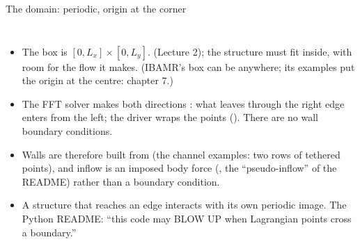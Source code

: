 \documentclass[aspectratio=169,11pt]{beamer}
\begin{document}
\begin{frame}{The domain: periodic, origin at the corner}
\label{fr:domain}
\begin{columns}[T]
\footnotesize
\begin{itemize}
  \item The box is $[0, L_x] \times [0, L_y]$.  (Lecture 2); the structure must fit inside, with room for the flow it makes. (IBAMR's box can be anywhere; its examples put the origin at the centre: chapter 7.)
  \item The FFT solver makes both directions : what leaves through the right edge enters from the left; the driver wraps the points (). There are no wall boundary conditions.
  \item Walls are therefore built from  (the channel examples: two rows of tethered points), and inflow is an imposed body force (, the ``pseudo-inflow'' of the README) rather than a boundary condition.
  \item A structure that reaches an edge interacts with its own periodic image. The Python README: ``this code may BLOW UP when Lagrangian points cross a boundary.''
\end{itemize}
\end{columns}
\end{frame}
\end{document}
